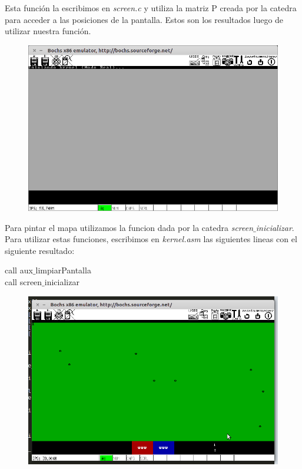 Esta función la escribimos en \textit{screen.c} y utiliza la matriz P creada por la catedra para acceder a las posiciones de la pantalla. Estos son los resultados luego de utilizar nuestra función. \\

\begin{figure}[H]
\begin{center}
  \includegraphics[width=\linewidth]{ejercicio1/pantgris.png}
  \caption{{\small}} 
\endminipage
\end{center}
\end{figure}


Para pintar el mapa utilizamos la funcion dada por la catedra  \textit{screen$\_$inicializar}. Para utilizar estas funciones, escribimos en \textit{kernel.asm} las siguientes lineas con el siguiente resultado:

\begin{center}
 call aux$\_$limpiarPantalla    \\
 call screen$\_$inicializar$~~~$
\end{center}

\begin{figure}[H]
\begin{center}
  \includegraphics[width=\linewidth]{ejercicio1/mapa.png}
  \caption{{\small}} 
\endminipage
\end{center}
\end{figure}
